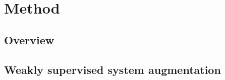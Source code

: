 \section{Method}
\label{sec:method}

\subsection{Overview}
\label{subsec:overview}

\subsection{Weakly supervised system augmentation}
\label{subsec:sys_augmentation}